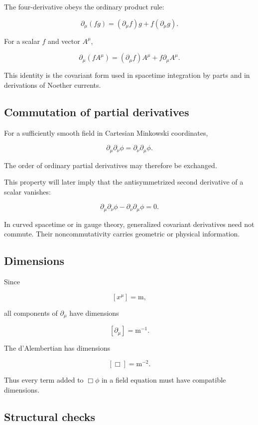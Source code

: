 The four-derivative obeys the ordinary product rule:

\[
\boxed{
\partial_{\mu}(fg)
=
(\partial_{\mu}f)g
+
f(\partial_{\mu}g)
}.
\]

For a scalar \(f\) and vector \(A^{\mu}\),

\[
\partial_{\mu}(fA^{\mu})
=
(\partial_{\mu}f)A^{\mu}
+
f\partial_{\mu}A^{\mu}.
\]

This identity is the covariant form used in spacetime integration by parts and in derivations of Noether currents.

\subsection{Commutation of partial derivatives}

For a sufficiently smooth field in Cartesian Minkowski coordinates,

\[
\boxed{
\partial_{\mu}\partial_{\nu}\phi
=
\partial_{\nu}\partial_{\mu}\phi
}.
\]

The order of ordinary partial derivatives may therefore be exchanged.

This property will later imply that the antisymmetrized second derivative of a scalar vanishes:

\[
\partial_{\mu}\partial_{\nu}\phi
-
\partial_{\nu}\partial_{\mu}\phi
=0.
\]

In curved spacetime or in gauge theory, generalized covariant derivatives need not commute. Their noncommutativity carries geometric or physical information.

\subsection{Dimensions}

Since

\[
[x^{\mu}]=\mathrm{m},
\]

all components of \(\partial_{\mu}\) have dimensions

\[
[\partial_{\mu}]=\mathrm{m}^{-1}.
\]

The d'Alembertian has dimensions

\[
[\Box]=\mathrm{m}^{-2}.
\]

Thus every term added to \(\Box\phi\) in a field equation must have compatible dimensions.

\subsection{Structural checks}

